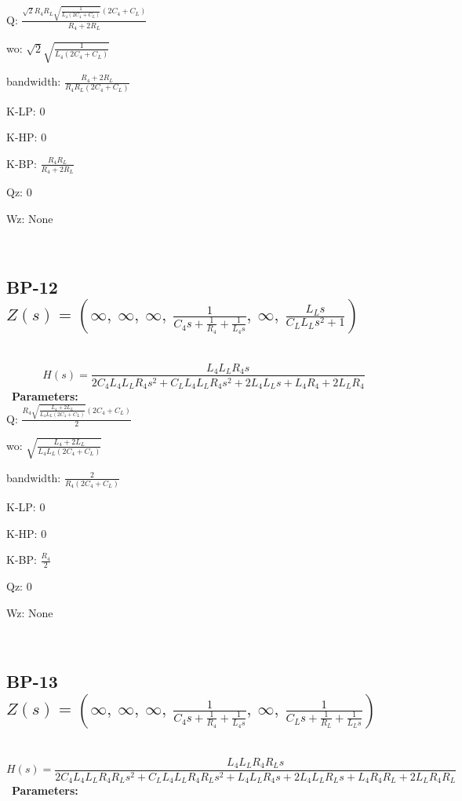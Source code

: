 \documentclass{article}
\begin{document}
Q: $\frac{\sqrt{2} R_{4} R_{L} \sqrt{\frac{1}{L_{4} \left(2 C_{4} + C_{L}\right)}} \left(2 C_{4} + C_{L}\right)}{R_{4} + 2 R_{L}}$\ 

wo: $\sqrt{2} \sqrt{\frac{1}{L_{4} \left(2 C_{4} + C_{L}\right)}}$\ 

bandwidth: $\frac{R_{4} + 2 R_{L}}{R_{4} R_{L} \left(2 C_{4} + C_{L}\right)}$\ 

K-LP: $0$\ 

K-HP: $0$\ 

K-BP: $\frac{R_{4} R_{L}}{R_{4} + 2 R_{L}}$\ 

Qz: $0$\ 

Wz: $\text{None}$\ 

\ 

\subsection{BP-12 $Z(s) = \left( \infty, \  \infty, \  \infty, \  \frac{1}{C_{4} s + \frac{1}{R_{4}} + \frac{1}{L_{4} s}}, \  \infty, \  \frac{L_{L} s}{C_{L} L_{L} s^{2} + 1}\right)$ } \ 
\textbf{\[H(s) = \frac{L_{4} L_{L} R_{4} s}{2 C_{4} L_{4} L_{L} R_{4} s^{2} + C_{L} L_{4} L_{L} R_{4} s^{2} + 2 L_{4} L_{L} s + L_{4} R_{4} + 2 L_{L} R_{4}}\] } \ 
\textbf{Parameters:}\\ 

Q: $\frac{R_{4} \sqrt{\frac{L_{4} + 2 L_{L}}{L_{4} L_{L} \left(2 C_{4} + C_{L}\right)}} \left(2 C_{4} + C_{L}\right)}{2}$\ 

wo: $\sqrt{\frac{L_{4} + 2 L_{L}}{L_{4} L_{L} \left(2 C_{4} + C_{L}\right)}}$\ 

bandwidth: $\frac{2}{R_{4} \left(2 C_{4} + C_{L}\right)}$\ 

K-LP: $0$\ 

K-HP: $0$\ 

K-BP: $\frac{R_{4}}{2}$\ 

Qz: $0$\ 

Wz: $\text{None}$\ 

\ 

\subsection{BP-13 $Z(s) = \left( \infty, \  \infty, \  \infty, \  \frac{1}{C_{4} s + \frac{1}{R_{4}} + \frac{1}{L_{4} s}}, \  \infty, \  \frac{1}{C_{L} s + \frac{1}{R_{L}} + \frac{1}{L_{L} s}}\right)$ } \ 
\textbf{\[H(s) = \frac{L_{4} L_{L} R_{4} R_{L} s}{2 C_{4} L_{4} L_{L} R_{4} R_{L} s^{2} + C_{L} L_{4} L_{L} R_{4} R_{L} s^{2} + L_{4} L_{L} R_{4} s + 2 L_{4} L_{L} R_{L} s + L_{4} R_{4} R_{L} + 2 L_{L} R_{4} R_{L}}\] } \ 
\textbf{Parameters:}\\ 
\end{document}
